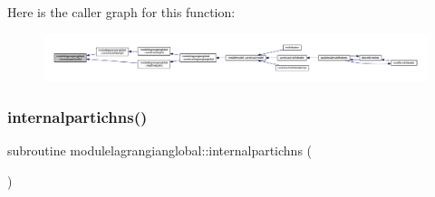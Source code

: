 Here is the caller graph for this function\+:\nopagebreak
\begin{figure}[H]
\begin{center}
\leavevmode
\includegraphics[width=350pt]{namespacemodulelagrangianglobal_ad71ed77715b3249cc24c592dfcca2fc8_icgraph}
\end{center}
\end{figure}
\mbox{\label{namespacemodulelagrangianglobal_a0d3f22e59bfbc417e9432a9f18a9027d}} 
\subsubsection{\texorpdfstring{internalpartichns()}{internalpartichns()}}
{\footnotesize\ttfamily subroutine modulelagrangianglobal\+::internalpartichns (\begin{DoxyParamCaption}{ }\end{DoxyParamCaption})\hspace{0.3cm}{\ttfamily [private]}}

